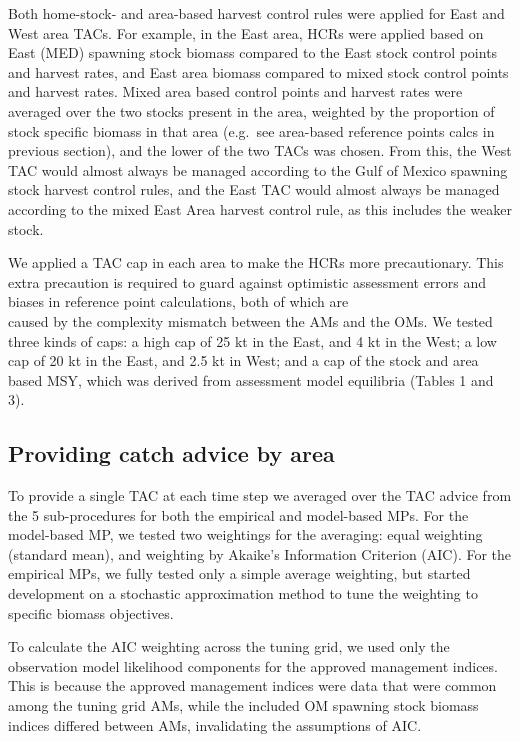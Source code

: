 \documentclass[]{article}
\begin{document}
Both home-stock- and area-based harvest control rules were applied for
East and West area TACs. For example, in the East area, HCRs were applied
based on East (MED) spawning stock biomass compared to the East stock
control points and harvest rates, and East area biomass compared to mixed
stock control points and harvest rates. Mixed area based control points
and harvest rates were averaged over the two stocks present in the area,
weighted by the proportion of stock specific biomass in that area
(e.g.~see area-based reference points calcs in previous section), and
the lower of the two TACs was chosen. From this, the West TAC would almost
always be managed according to the Gulf of Mexico spawning stock harvest
control rules, and the East TAC would almost always be managed according
to the mixed East Area harvest control rule, as this includes the weaker
stock.

We applied a TAC cap in each area to make the HCRs more precautionary. This
extra precaution is required to guard against optimistic assessment errors
and biases in reference point calculations, both of which are\\
caused by the complexity mismatch between the AMs and the OMs. We tested
three kinds of caps: a high cap of 25 kt in the East, and 4 kt in the West;
a low cap of 20 kt in the East, and 2.5 kt in West; and a cap of the
stock and area based MSY, which was derived from assessment model
equilibria (Tables 1 and 3).

\hypertarget{providing-catch-advice-by-area}{%
\subsection{Providing catch advice by area}\label{providing-catch-advice-by-area}}

To provide a single TAC at each time step we averaged over the TAC
advice from the 5 sub-procedures for both the empirical and
model-based MPs. For the model-based MP, we tested two weightings
for the averaging: equal weighting (standard mean), and weighting
by Akaike's Information Criterion (AIC). For the empirical MPs,
we fully tested only a simple average weighting, but started
development on a stochastic approximation method to tune the
weighting to specific biomass objectives.

To calculate the AIC weighting across the tuning grid, we used only
the observation model likelihood components for the approved management
indices. This is because the approved management indices were data
that were common among the tuning grid AMs, while the included OM
spawning stock biomass indices differed between AMs, invalidating
the assumptions of AIC.
\end{document}
